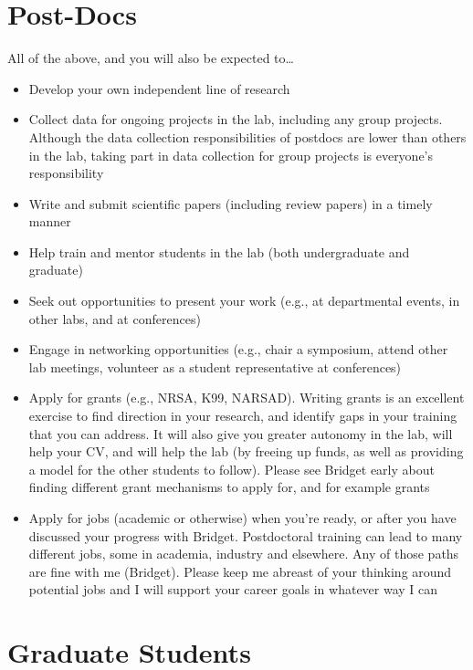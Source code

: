 \documentclass[]{book}
\providecommand{\tightlist}{%
  \setlength{\itemsep}{0pt}\setlength{\parskip}{0pt}}
\begin{document}
\hypertarget{post-docs}{%
\section{Post-Docs}\label{post-docs}}

All of the above, and you will also be expected to\ldots{}

\begin{itemize}
\tightlist
\item
  Develop your own independent line of research
\item
  Collect data for ongoing projects in the lab, including any group projects. Although the data collection responsibilities of postdocs are lower than others in the lab, taking part in data collection for group projects is everyone's responsibility
\item
  Write and submit scientific papers (including review papers) in a timely manner
\item
  Help train and mentor students in the lab (both undergraduate and graduate)
\item
  Seek out opportunities to present your work (e.g., at departmental events, in other labs, and at conferences)
\item
  Engage in networking opportunities (e.g., chair a symposium, attend other lab meetings, volunteer as a student representative at conferences)
\item
  Apply for grants (e.g., NRSA, K99, NARSAD). Writing grants is an excellent exercise to find direction in your research, and identify gaps in your training that you can address. It will also give you greater autonomy in the lab, will help your CV, and will help the lab (by freeing up funds, as well as providing a model for the other students to follow). Please see Bridget early about finding different grant mechanisms to apply for, and for example grants
\item
  Apply for jobs (academic or otherwise) when you're ready, or after you have discussed your progress with Bridget. Postdoctoral training can lead to many different jobs, some in academia, industry and elsewhere. Any of those paths are fine with me (Bridget). Please keep me abreast of your thinking around potential jobs and I will support your career goals in whatever way I can
\end{itemize}

\hypertarget{graduate-students}{%
\section{Graduate Students}\label{graduate-students}}
\end{document}
